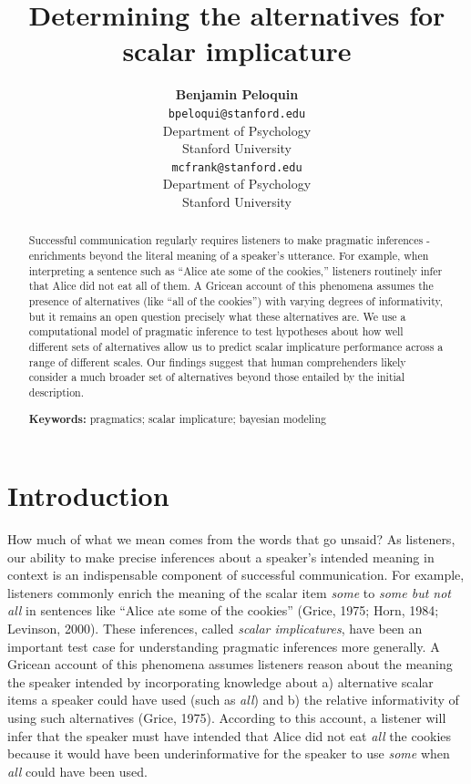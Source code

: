 \documentclass[10pt, letterpaper]{article}
\title{Determining the alternatives for scalar implicature}
\author{{\large \bf Benjamin Peloquin} \\ \texttt{bpeloqui@stanford.edu} \\ Department of Psychology \\ Stanford University \And {\large \bf Michael C. Frank} \\ \texttt{mcfrank@stanford.edu} \\ Department of Psychology \\ Stanford University}
\begin{document}
\maketitle

\begin{abstract}
Successful communication regularly requires listeners to make pragmatic
inferences - enrichments beyond the literal meaning of a speaker's
utterance. For example, when interpreting a sentence such as ``Alice ate
some of the cookies,'' listeners routinely infer that Alice did not eat
all of them. A Gricean account of this phenomena assumes the presence of
alternatives (like ``all of the cookies'') with varying degrees of
informativity, but it remains an open question precisely what these
alternatives are. We use a computational model of pragmatic inference to
test hypotheses about how well different sets of alternatives allow us
to predict scalar implicature performance across a range of different
scales. Our findings suggest that human comprehenders likely consider a
much broader set of alternatives beyond those entailed by the initial
description.

\textbf{Keywords:}
pragmatics; scalar implicature; bayesian modeling
\end{abstract}

\section{Introduction}\label{introduction}

How much of what we mean comes from the words that go unsaid? As
listeners, our ability to make precise inferences about a speaker's
intended meaning in context is an indispensable component of successful
communication. For example, listeners commonly enrich the meaning of the
scalar item \emph{some} to \emph{some but not all} in sentences like
``Alice ate some of the cookies'' (Grice, 1975; Horn, 1984; Levinson,
2000). These inferences, called \emph{scalar implicatures}, have been an
important test case for understanding pragmatic inferences more
generally. A Gricean account of this phenomena assumes listeners reason
about the meaning the speaker intended by incorporating knowledge about
a) alternative scalar items a speaker could have used (such as
\emph{all}) and b) the relative informativity of using such alternatives
(Grice, 1975). According to this account, a listener will infer that the
speaker must have intended that Alice did not eat \emph{all} the cookies
because it would have been underinformative for the speaker to use
\emph{some} when \emph{all} could have been used.
\end{document}
